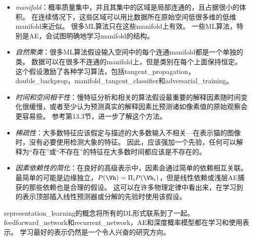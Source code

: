 \begin{itemize}
	\item \emph{\gls{manifold}}：概率质量集中，并且其集中的区域是局部连通的，且占据很小的体积。
	在连续情况下，这些区域可以用比数据所在原始空间低很多维的低维\gls{manifold}来近似。
	很多\gls{ML}算法只在这些\gls{manifold}上有效\citep{Goodfellow-2015-adversarial}。
	一些\gls{ML}算法，特别是\gls{AE}，会试图明确地学习\gls{manifold}的结构。


	\item \emph{自然聚类}：很多\gls{ML}算法假设输入空间中的每个连通\gls{manifold}都是一个单独的类。
	数据可以在很多不连通的\gls{manifold}上，但是类别在每个上面保持恒定。
	这个假设激励了各种学习算法，包括\gls{tangent_propagation}，\gls{double_backprop}，\gls{manifold_tangent_classifier}和\gls{adversarial_training}。


	\item \emph{时间和空间相干性}：慢特征分析和相关的算法假设最重要的解释因素随时间变化很缓慢，或者至少认为预测真实的解释因素比预测诸如像素值的原始观察会更容易些。
	参考第13.3节，进一步了解这个方法。


	\item \emph{稀疏性}：大多数特征应该假定与描述的大多数输入不相关---在表示猫的图像时，没有必要使用检测大象的特征。
	因此，应该强加一个先验，任何可以解释为“存在”或“不存在”的特征在大多数时间都应该是不存在的。


	\item \emph{因素依赖性的简化}：在良好的高级表示中，因素会通过简单的依赖相互关联。
	最简单的可能是边缘独立，$P(\Vh) = \Pi_i P(\Vh_i)$，但是线性依赖或浅层\gls{AE}捕获的那些依赖也是合理的假设。
	这可以在许多物理定律中看出来，在学习到的表示顶部插入线性预测器或分解的先验时使用该假设。
\end{itemize}


\gls{representation_learning}的概念将所有的\gls{DL}形式联系到了一起。
\gls{feedforward_network}和\gls{recurrent_network}，\gls{AE}和深度概率模型都在学习和使用表示。
学习最好的表示仍然是一个令人兴奋的研究方向。


